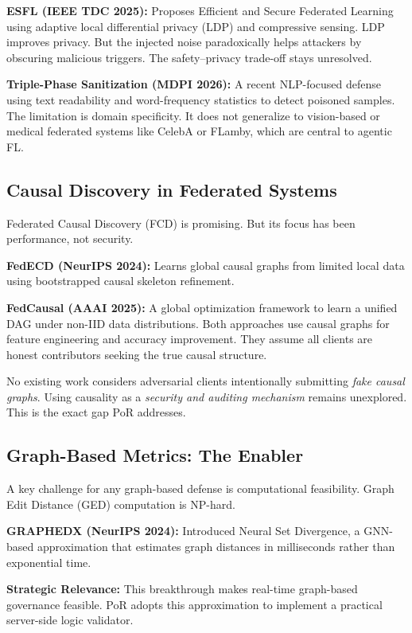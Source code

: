 \documentclass[journal]{IEEEtran}
\begin{document}
\textbf{ESFL (IEEE TDC 2025):}
Proposes Efficient and Secure Federated Learning using adaptive local differential privacy (LDP) and compressive sensing. LDP improves privacy. But the injected noise paradoxically helps attackers by obscuring malicious triggers. The safety--privacy trade-off stays unresolved.

\textbf{Triple-Phase Sanitization (MDPI 2026):}
A recent NLP-focused defense using text readability and word-frequency statistics to detect poisoned samples. The limitation is domain specificity. It does not generalize to vision-based or medical federated systems like CelebA or FLamby, which are central to agentic FL.

\subsection{Causal Discovery in Federated Systems}

Federated Causal Discovery (FCD) is promising. But its focus has been performance, not security.

\textbf{FedECD (NeurIPS 2024):}
Learns global causal graphs from limited local data using bootstrapped causal skeleton refinement.

\textbf{FedCausal (AAAI 2025):}
A global optimization framework to learn a unified DAG under non-IID data distributions. Both approaches use causal graphs for feature engineering and accuracy improvement. They assume all clients are honest contributors seeking the true causal structure.

No existing work considers adversarial clients intentionally submitting \emph{fake causal graphs}. Using causality as a \emph{security and auditing mechanism} remains unexplored. This is the exact gap PoR addresses.

\subsection{Graph-Based Metrics: The Enabler}

A key challenge for any graph-based defense is computational feasibility. Graph Edit Distance (GED) computation is NP-hard.

\textbf{GRAPHEDX (NeurIPS 2024):}
Introduced Neural Set Divergence, a GNN-based approximation that estimates graph distances in milliseconds rather than exponential time.

\textbf{Strategic Relevance:}
This breakthrough makes real-time graph-based governance feasible. PoR adopts this approximation to implement a practical server-side logic validator.
\end{document}
